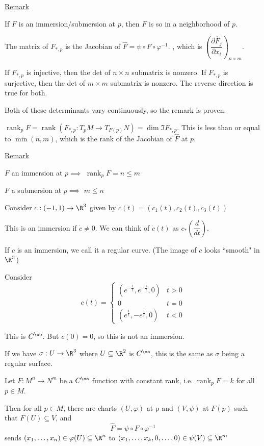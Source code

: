 \documentclass[x11names,reqno,14pt]{extarticle}
\DeclareMathOperator{\rank}{rank}
\newcommand{\pp}[2]{\dfrac{\partial #1}{\partial #2}}
\newcommand{\dd}[2]{\dfrac{d#1}{d#2}}
\renewcommand{\phi}{\varphi}
\begin{document}
\underline{Remark}

If $F$ is an immersion/submersion at $p$, then $F$ is so in a neighborhood of $p$. 

The matrix of $F_{*,p}$ is the Jacobian of $\hat{F} = \psi \circ F \circ \phi^{-1}$. , which is $\left(\pp{\hat{F}_j}{x_i}\right)_{n\times m}$. 

If $F_{*,p}$ is injective, then the det of $n\times n$ submatrix is nonzero. If $F_{*,p}$ is surjective, then the det of $m\times m$ submatrix is nonzero. The reverse direction is true for both.

Both of these determinants vary continuously, so the remark is proven. 


$\rank_pF = \rank(F_{*,p}:T_pM\to T_{F(p)}N) = \dim\Im F_{*,p}$. This is less than or equal to $\min(n, m)$, which is the rank of the Jacobian of $\hat{F}$ at $p$. 

\underline{Remark}

$F$ an immersion at $p \implies$ $\rank_pF = n \leq m$

$F$ a submersion at $p \implies$ $m \leq n$

\exm

Consider $c:(-1,1)\to\R^3$ given by $c(t) = (c_1(t), c_2(t), c_3(t))$

This is an immersion if $\dot{c}\neq0$. We can think of $\dot{c}(t)$ as $c_*\left(\dd{}{t}\right)$. 

If $c$ is an immersion, we call it a regular curve. (The image of $c$ looks ``smooth" in $\R^3$)

Consider
\[
c(t) = \begin{cases} (e^{-\frac{1}{t}}, e^{-\frac{1}{t}}, 0) & t > 0 \\ 0 & t = 0\\ (e^{\frac{1}{t}}, -e^{\frac{1}{t}},0) & t < 0 \end{cases}
\]

This is $C^\oo$. But $\dot{c}(0) = 0$, so this is not an immersion. 

\exm

If we have $\sigma:U \to \R^3$ where $U \subseteq \R^2$ is $C^\oo$, this is the same as $\sigma$ being a regular surface. 


Let $F:M^n\to N^m$ be a $C^\oo$ function with constant rank, i.e. $\rank_pF = k$ for all $p \in M$. 

Then for all $p \in M$, there are charts $(U,\phi)$ at p and $(V,\psi)$ at $F(p)$ such that $F(U) \subseteq V$, and
\[
\hat{F} = \psi\circ F \circ \phi^{-1}
\]
sends $(x_1, \dots, x_n) \in \phi(U)\subseteq\R^n$ to $(x_1, \dots, x_k, 0, \dots, 0) \in \psi(V) \subseteq \R^m$
\end{document}
